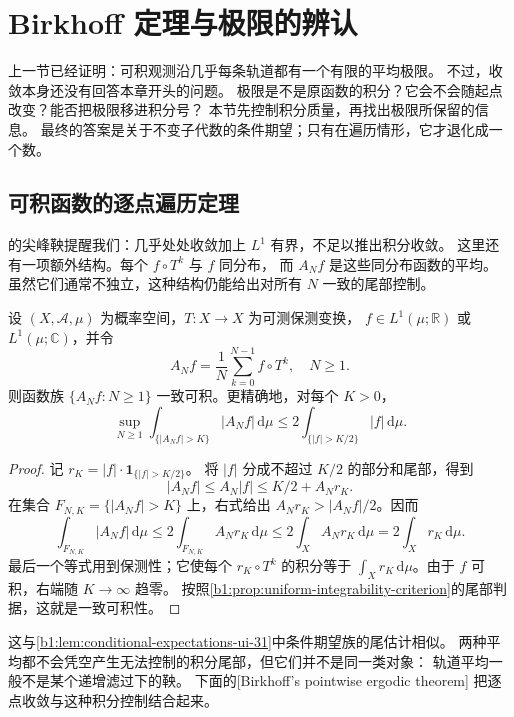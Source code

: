 \section{Birkhoff 定理与极限的辨认}
\label{b1:sec:3204}

上一节已经证明：可积观测沿几乎每条轨道都有一个有限的平均极限。
不过，收敛本身还没有回答本章开头的问题。
极限是不是原函数的积分？它会不会随起点改变？能否把极限移进积分号？
本节先控制积分质量，再找出极限所保留的信息。
最终的答案是关于不变子代数的条件期望；只有在遍历情形，它才退化成一个数。

\subsection{可积函数的逐点遍历定理}
\label{b1:subsec:320401}

的尖峰鞅提醒我们：几乎处处收敛加上 \(L^1\) 有界，不足以推出积分收敛。
这里还有一项额外结构。每个 \(f\circ T^k\) 与 \(f\) 同分布，
而 \(A_Nf\) 是这些同分布函数的平均。
虽然它们通常不独立，这种结构仍能给出对所有 \(N\) 一致的尾部控制。

\begin{lemma}[轨道平均的一致可积性]
\label{b1:lem:ergodic-averages-ui-32}
设 \((X,\mathcal A,\mu)\) 为概率空间，\(T:X\to X\) 为可测保测变换，
\(f\in L^1(\mu;\mathbb R)\) 或 \(L^1(\mu;\mathbb C)\)，并令
\[
 A_Nf=\frac1N\sum_{k=0}^{N-1}f\circ T^k,\quad N\geq1.
\]
则函数族 \(\{A_Nf:N\geq1\}\) 一致可积。更精确地，对每个 \(K>0\)，
\[
 \sup_{N\geq1}\int_{\{|A_Nf|>K\}}|A_Nf|\,\mathrm d\mu
 \leq2\int_{\{|f|>K/2\}}|f|\,\mathrm d\mu.
\]
\end{lemma}
\begin{proof}
记 \(r_K=|f|\cdot\mathbf1_{\{|f|>K/2\}}\)。
将 \(|f|\) 分成不超过 \(K/2\) 的部分和尾部，得到
\[
 |A_Nf|\leq A_N|f|\leq K/2+A_Nr_K.
\]
在集合 \(F_{N,K}=\{|A_Nf|>K\}\) 上，右式给出
\(A_Nr_K>|A_Nf|/2\)。因而
\[
 \int_{F_{N,K}}|A_Nf|\,\mathrm d\mu
 \leq2\int_{F_{N,K}}A_Nr_K\,\mathrm d\mu
 \leq2\int_XA_Nr_K\,\mathrm d\mu
 =2\int_Xr_K\,\mathrm d\mu.
\]
最后一个等式用到保测性；它使每个 \(r_K\circ T^k\) 的积分等于
\(\int_Xr_K\,\mathrm d\mu\)。由于 \(f\) 可积，右端随 \(K\to\infty\) 趋零。
按照\cref{b1:prop:uniform-integrability-criterion}的尾部判据，这就是一致可积性。
\end{proof}

这与\cref{b1:lem:conditional-expectations-ui-31}中条件期望族的尾估计相似。
两种平均都不会凭空产生无法控制的积分尾部，但它们并不是同一类对象：
轨道平均一般不是某个递增滤过下的鞅。
下面的[Birkhoff's pointwise ergodic theorem]%
把逐点收敛与这种积分控制结合起来。

